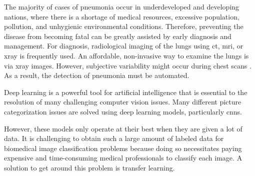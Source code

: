 \documentclass[conference]{IEEEtran}
\begin{document}
The majority of cases of pneumonia occur in underdeveloped and developing nations, where there is a shortage of medical resources, excessive population, pollution, and unhygienic environmental conditions.
%
Therefore, preventing the disease from becoming fatal can be greatly assisted by early diagnosis and management. For diagnosis, radiological imaging of the lungs using \gls{ct}, \gls{mri}, or \gls{xray} is frequently used. An affordable, non-invasive way to examine the lungs is via \gls{xray} images.
%
However, subjective variability might occur during chest scans \cite{neuman2012variability, williams2013variability}. As a result, the detection of pneumonia must be automated.

Deep learning is a powerful tool for artificial intelligence that is essential to the resolution of many challenging computer vision issues. Many different picture categorization issues are solved using deep learning models, particularly \glspl{cnn}.

However, these models only operate at their best when they are given a lot of data. It is challenging to obtain such a large amount of labeled data for biomedical image classification problems because doing so necessitates paying expensive and time-consuming medical professionals to classify each image. A solution to get around this problem is transfer learning.
\end{document}
